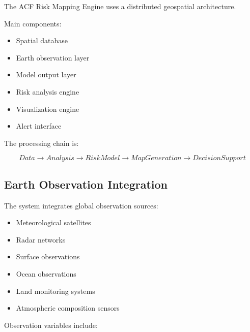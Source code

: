 The ACF Risk Mapping Engine uses a distributed geospatial architecture.

Main components:

\begin{itemize}

\item Spatial database

\item Earth observation layer

\item Model output layer

\item Risk analysis engine

\item Visualization engine

\item Alert interface

\end{itemize}


The processing chain is:

\[
Data
\rightarrow
Analysis
\rightarrow
RiskModel
\rightarrow
MapGeneration
\rightarrow
DecisionSupport
\]



\subsection{Earth Observation Integration}

The system integrates global observation sources:

\begin{itemize}

\item Meteorological satellites

\item Radar networks

\item Surface observations

\item Ocean observations

\item Land monitoring systems

\item Atmospheric composition sensors

\end{itemize}


Observation variables include:

